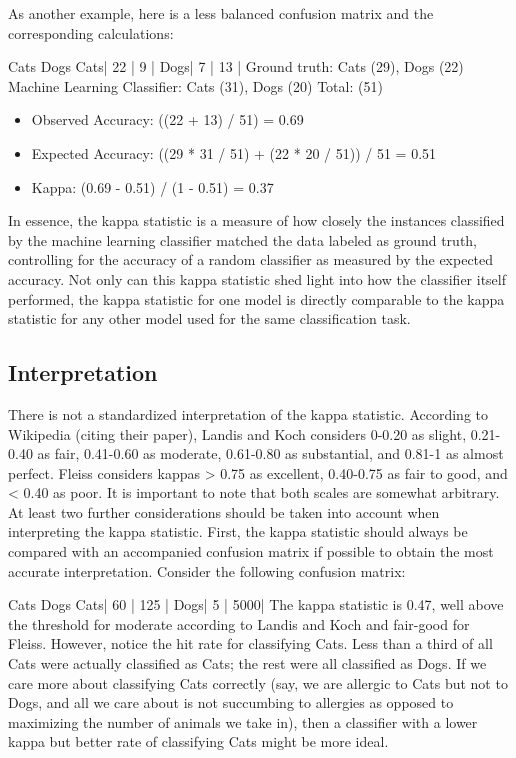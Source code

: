 \documentclass[caret-main.tex]{subfiles}
\begin{document}
As another example, here is a less balanced confusion matrix and the corresponding calculations:

     Cats Dogs
Cats| 22 | 9  |
Dogs| 7  | 13 |
Ground truth: Cats (29), Dogs (22) 
Machine Learning Classifier: Cats (31), Dogs (20) 
Total: (51) 

\begin{itemize}
\item Observed Accuracy: ((22 + 13) / 51) = 0.69 
\item Expected Accuracy: ((29 * 31 / 51) + (22 * 20 / 51)) / 51 = 0.51 
\item Kappa: (0.69 - 0.51) / (1 - 0.51) = 0.37
\end{itemize}
In essence, the kappa statistic is a measure of how closely the instances classified by the machine learning classifier matched the data labeled as ground truth, controlling for the accuracy of a random classifier as measured by the expected accuracy. Not only can this kappa statistic shed light into how the classifier itself performed, the kappa statistic for one model is directly comparable to the kappa statistic for any other model used for the same classification task.

\subsection{Interpretation}

There is not a standardized interpretation of the kappa statistic. According to Wikipedia (citing their paper), Landis and Koch considers 0-0.20 as slight, 0.21-0.40 as fair, 0.41-0.60 as moderate, 0.61-0.80 as substantial, and 0.81-1 as almost perfect. Fleiss considers kappas > 0.75 as excellent, 0.40-0.75 as fair to good, and < 0.40 as poor. It is important to note that both scales are somewhat arbitrary. At least two further considerations should be taken into account when interpreting the kappa statistic. First, the kappa statistic should always be compared with an accompanied confusion matrix if possible to obtain the most accurate interpretation. Consider the following confusion matrix:

     Cats Dogs
Cats| 60 | 125 |
Dogs| 5  | 5000|
\newpage
The kappa statistic is 0.47, well above the threshold for moderate according to Landis and Koch and fair-good for Fleiss. However, notice the hit rate for classifying Cats. Less than a third of all Cats were actually classified as Cats; the rest were all classified as Dogs. If we care more about classifying Cats correctly (say, we are allergic to Cats but not to Dogs, and all we care about is not succumbing to allergies as opposed to maximizing the number of animals we take in), then a classifier with a lower kappa but better rate of classifying Cats might be more ideal.
\end{document}
